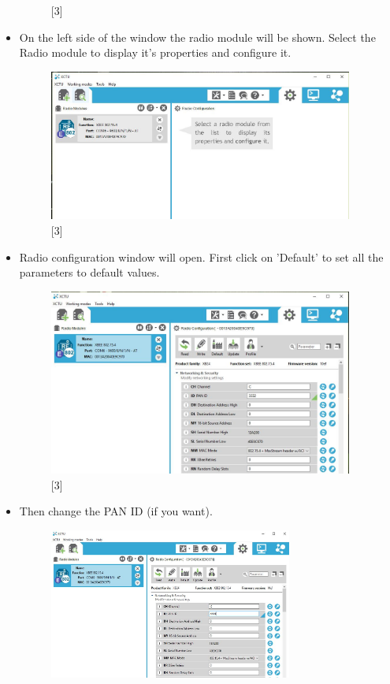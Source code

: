\documentclass[11pt,a4paper]{article}
\begin{document}
\begin{itemize}
\begin{figure}[h!]
			\centering
			\caption{[3]}
		\end{figure} 
		\item On the left side of the window the radio module will be shown. Select the Radio module to display it's properties and configure it.
		\begin{figure}[h!]
			\includegraphics[width=10cm]{Capture3.jpg}
			\centering
			\caption{[3]}
		\end{figure} 
		\item Radio configuration window will open. First click on 'Default' to set all the parameters to default values.
		\begin{figure}[h!]
			\includegraphics[width=10cm]{Capture4.jpg}
			\centering
			\caption{[3]}
		\end{figure} 
		\item Then change the PAN ID (if you want).
		\begin{figure}[h!]
			\includegraphics[width=8cm]{Capture5.jpg}

\end{figure}
\end{itemize}
\end{document}
